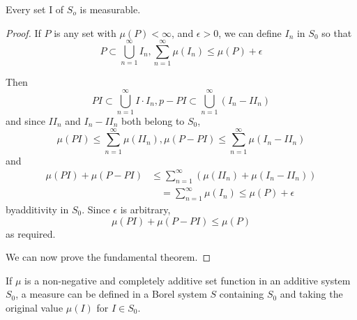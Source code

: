 \begin{theorem}\label{chap1:sec7:thm6}%
  Every set I of $S_o$ is measurable. 
\end{theorem}

\begin{proof}
If $P$ is any set with $\mu (P)<\infty$, and
  $\epsilon > 0$,  we can define $I_n$ in \break $S_0$ so that 
$$ 
P \subset  \bigcup_{n=1}^{\infty} I_n ,
\sum_{n=1}^{\infty} \mu(I_n)\leq \mu (P) + \epsilon  
$$

Then
$$ 
PI  \subset{\displaystyle\mathop{\bigcup}_{n=1}^{\infty}} I\cdot I_n , p-PI \subset
\bigcup_{n=1}^{\infty} (I_n - II_n)  
$$
and since $I I_n $ and $I_n-II_n$ both belong to $S_0$,
$$ 
\mu (PI) \leq  \sum_{n=1}^{\infty} \mu (II_n), \mu
(P-PI) \leq  \sum_{n=1}^{\infty}\mu (I_n-II_n)   
$$
and
\begin{align*}
\mu (PI)+ \mu (P-PI) &\leq  \sum_{n=1}^{\infty}  (\mu (II_n)+\mu (I_n-II_n))\\
 &\quad =  \sum_{n=1}^{\infty} \mu (I_n)\leq \mu (P) + \epsilon 
 \end{align*}
 by\pageoriginale additivity in $S_0$. Since $\epsilon$ is arbitrary,
 $$ 
\mu (PI)+ \mu (P-PI)\le\mu(P)
$$
 as required.
 
 We can now prove the fundamental theorem.
\end{proof}

\begin{theorem}\label{chap1:sec7:thm7}%
  If $\mu$ is a non-negative and completely additive set function in
  an additive system $S_0$, a measure can be defined in a Borel system
  $S$ containing $S_0$ and taking the original value $\mu(I)$ for $I
  \in S_0$. 
\end{theorem}

